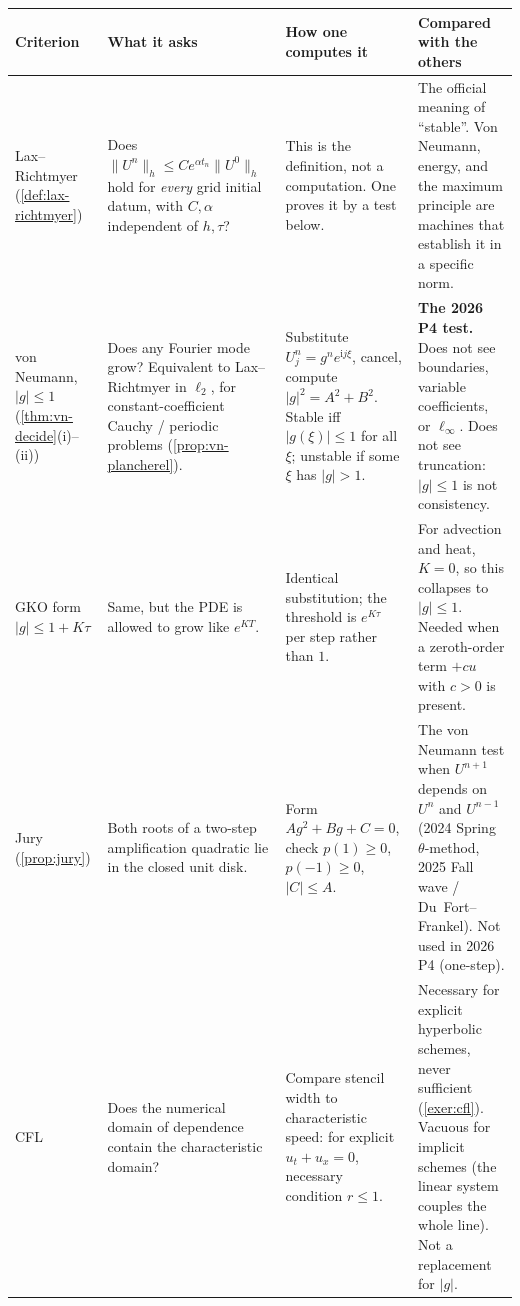 \documentclass[11pt,a4paper]{article}
\begin{document}
{\footnotesize
\begin{center}
\begin{tabular}{@{}>{\raggedright\arraybackslash}p{2.55cm}
                   >{\raggedright\arraybackslash}p{3.85cm}
                   >{\raggedright\arraybackslash}p{3.85cm}
                   >{\raggedright\arraybackslash}p{3.55cm}@{}}
\toprule
Criterion & What it asks & How one computes it & Compared with the others \\
\midrule
Lax--Richtmyer
(\cref{def:lax-richtmyer})
&
Does \(\|U^n\|_h\le C e^{\alpha t_n}\|U^0\|_h\) hold for \emph{every} grid initial datum, with \(C,\alpha\) independent of \(h,\tau\)?
&
This is the definition, not a computation. One proves it by a test below.
&
The official meaning of ``stable''. Von Neumann, energy, and the maximum principle are machines that establish it in a specific norm.
\\
\addlinespace
von Neumann, \(\lvert g\rvert\le 1\)
(\cref{thm:vn-decide}(i)--(ii))
&
Does any Fourier mode grow? Equivalent to Lax--Richtmyer in \(\ell_2\), for constant-coefficient Cauchy / periodic problems (\cref{prop:vn-plancherel}).
&
Substitute \(U_j^n=g^n e^{\mathrm i j\xi}\), cancel, compute \(\lvert g\rvert^2=A^2+B^2\). Stable iff \(\lvert g(\xi)\rvert\le 1\) for all \(\xi\); unstable if some \(\xi\) has \(\lvert g\rvert>1\).
&
\textbf{The 2026 P4 test.} Does not see boundaries, variable coefficients, or \(\ell_\infty\). Does not see truncation: \(\lvert g\rvert\le 1\) is not consistency.
\\
\addlinespace
GKO form \(\lvert g\rvert\le 1+K\tau\)
&
Same, but the PDE is allowed to grow like \(e^{KT}\).
&
Identical substitution; the threshold is \(e^{K\tau}\) per step rather than \(1\).
&
For advection and heat, \(K=0\), so this collapses to \(\lvert g\rvert\le 1\). Needed when a zeroth-order term \(+cu\) with \(c>0\) is present.
\\
\addlinespace
Jury
(\cref{prop:jury})
&
Both roots of a two-step amplification quadratic lie in the closed unit disk.
&
Form \(Ag^2+Bg+C=0\), check \(p(1)\ge 0\), \(p(-1)\ge 0\), \(\lvert C\rvert\le A\).
&
The von Neumann test when \(U^{n+1}\) depends on \(U^n\) and \(U^{n-1}\) (2024 Spring \(\theta\)-method, 2025 Fall wave / Du~Fort--Frankel). Not used in 2026 P4 (one-step).
\\
\addlinespace
CFL
&
Does the numerical domain of dependence contain the characteristic domain?
&
Compare stencil width to characteristic speed: for explicit \(u_t+u_x=0\), necessary condition \(r\le 1\).
&
Necessary for explicit hyperbolic schemes, never sufficient (\cref{exer:cfl}). Vacuous for implicit schemes (the linear system couples the whole line). Not a replacement for \(\lvert g\rvert\).

\end{tabular}
\end{center}}
\end{document}
